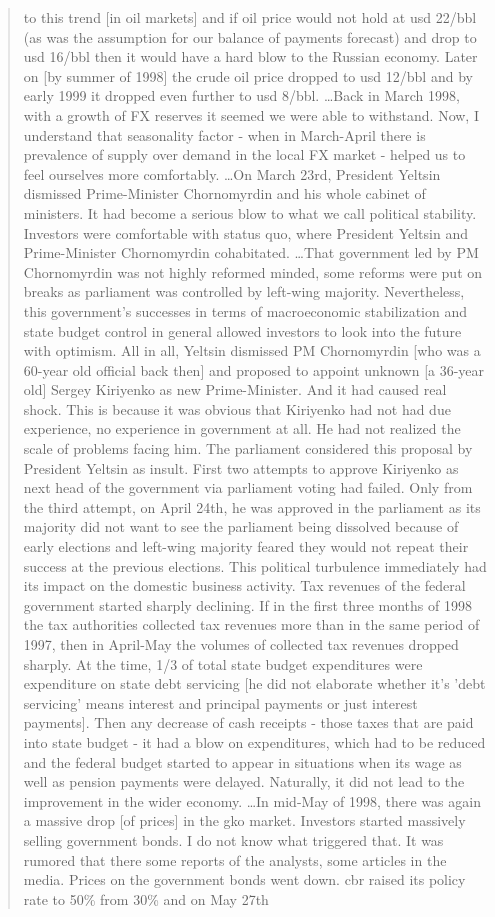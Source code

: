 \begin{quote}
to this trend [in oil markets] and if oil price would not hold at \ac{usd} 22/bbl (as was the assumption for our balance of payments forecast) and drop to \ac{usd} 16/bbl then it would have a hard blow to the Russian economy. Later on [by summer of 1998] the crude oil price dropped to \ac{usd} 12/bbl and by early 1999 it dropped even further to \ac{usd} 8/bbl. \dots Back in March 1998, with a growth of FX reserves it seemed we were able to withstand. Now, I understand that seasonality factor - when in March-April there is prevalence of supply over demand in the local FX market - helped us to feel ourselves more comfortably. \dots On March 23rd, President Yeltsin dismissed Prime-Minister Chornomyrdin and his whole cabinet of ministers. It had become a serious blow to what we call political stability. Investors were comfortable with status quo, where President Yeltsin and Prime-Minister Chornomyrdin cohabitated. \dots That government led by PM Chornomyrdin was not highly reformed minded, some reforms were put on breaks as parliament was controlled by left-wing majority. Nevertheless, this government's successes in terms of macroeconomic stabilization and state budget control in general allowed investors to look into the future with optimism. All in all, Yeltsin dismissed PM Chornomyrdin [who was a 60-year old official back then] and proposed to appoint unknown [a 36-year old] Sergey Kiriyenko as new Prime-Minister. And it had caused real shock. This is because it was obvious that Kiriyenko had not had due experience, no experience in government at all. He had not realized the scale of problems facing him. The parliament considered this proposal by President Yeltsin as insult. First two attempts to approve Kiriyenko as next head of the government via parliament voting had failed. Only from the third attempt, on April 24th, he was approved in the parliament as its majority did not want to see the parliament being dissolved because of early elections and left-wing majority feared they would not repeat their success at the previous elections. This political turbulence immediately had its impact on the domestic business activity. Tax revenues of the federal government started sharply declining. If in the first three months of 1998 the tax authorities collected tax revenues more than in the same period of 1997, then in April-May the volumes of collected tax revenues dropped sharply. At the time, 1/3 of total state budget expenditures were expenditure on state debt servicing [he did not elaborate whether it's 'debt servicing' means interest and principal payments or just interest payments]. Then any decrease of cash receipts - those taxes that are paid into state budget - it had a blow on expenditures, which had to be reduced and the federal budget started to appear in situations when its wage as well as pension payments were delayed. Naturally, it did not lead to the improvement in the wider economy. \dots In mid-May of 1998, there was again a massive drop [of prices] in the \ac{gko} market. Investors started massively selling government bonds. I do not know what triggered that. It was rumored that there some reports of the analysts, some articles in the media. Prices on the government bonds went down. \ac{cbr} raised its policy rate to 50\% from 30\% and on May 27th 
\end{quote}
